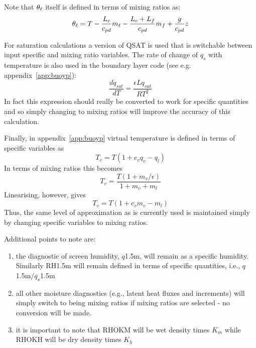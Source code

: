 \documentclass{UMDP_article}
\begin{document}
Note that $\theta_{\ell}$ itself is defined in terms
of mixing ratios as:
\begin{equation}
  \theta_{\ell} = T - \frac{L_c}{c_{pd}} m_{\ell} 
  - \frac{L_c+L_f}{c_{pd}} m_f + \frac{g}{c_{pd}} z  
  \label{sl_defn}
\end{equation}

For saturation calculations a version of QSAT is used that is
switchable between input specific and mixing ratio variables.  The
rate of change of $q_s$ with temperature is also used in the boundary
layer code (see e.g. appendix~\ref{app:buoyp}):
\begin{equation*}
  \frac{ d q_{sat} }{ dT } = \frac{\epsilon L q_{sat} }{RT^2}
\end{equation*}
In fact this expression should really be converted to work for
specific quantities and so simply changing to mixing ratios will
improve the accuracy of this calculation.

Finally, in appendix~\ref{app:buoyp} virtual temperature is defined in
terms of specific variables as
\begin{equation*}
  T_v = T ( 1 + c_v q_v - q_l )
\end{equation*}
In terms of mixing ratios this becomes
\begin{equation*}
  T_v = \frac{T ( 1 + m_v/\epsilon )}{ 1 + m_v + m_l }
\end{equation*}
Linearising, however, gives
\begin{equation*}
  T_v = T ( 1 + c_v m_v - m_l )
\end{equation*}
Thus, the same level of approximation as is currently used is
maintained simply by changing specific variables to mixing ratios.

Additional points to note are:
\begin{enumerate}
\item the diagnostic of screen humidity, $q$1.5m, will remain as a
  specific humidity. Similarly RH1.5m will remain defined in terms of
  specific quantities, \mbox{i.e.}, $q$1.5m$/q_s$1.5m
\item all other moisture diagnostics (\mbox{e.g.}, latent heat fluxes
  and increments) will simply switch to being mixing ratios if mixing
  ratios are selected - no conversion will be made.
\item it is important to note that RHOKM will be wet density times
  $K_m$ while RHOKH will be dry density times $K_h$
\end{enumerate}

\end{document}
